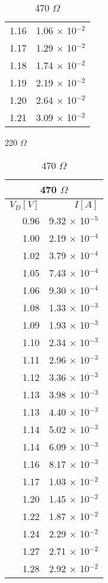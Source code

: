 \documentclass{ltjsarticle}
\begin{document}
\begin{table}[H]
\begin{minipage}[t]{0.24\hsize}
\begin{tabular}{|r|r|}
      1.16 & 1.06 ${\times}$ 10${^{-2}}$ \\
      1.17 & 1.29 ${\times}$ 10${^{-2}}$ \\
      1.18 & 1.74 ${\times}$ 10${^{-2}}$ \\
      1.19 & 2.19 ${\times}$ 10${^{-2}}$ \\
      1.20 & 2.64 ${\times}$ 10${^{-2}}$ \\
      1.21 & 3.09 ${\times}$ 10${^{-2}}$ \\ \hline
  \end{tabular}
  \caption{220 ${\Omega}$}
\end{minipage}
\begin{minipage}[t]{0.24\hsize}
  \vspace{0pt}
  \begin{tabular}{|r|r|}
    \hline
    \multicolumn{2}{|c|}{470 ${\Omega}$} \\ \hline
    ${V_D[V]}$ & ${I[A]}$ \\
    \hline
    0.96 & 9.32 ${\times}$ 10${^{-5}}$ \\
    1.00 & 2.19 ${\times}$ 10${^{-4}}$ \\
    1.02 & 3.79 ${\times}$ 10${^{-4}}$ \\
    1.05 & 7.43 ${\times}$ 10${^{-4}}$ \\
    1.06 & 9.30 ${\times}$ 10${^{-4}}$ \\
    1.08 & 1.33 ${\times}$ 10${^{-3}}$ \\
    1.09 & 1.93 ${\times}$ 10${^{-3}}$ \\
    1.10 & 2.34 ${\times}$ 10${^{-3}}$ \\
    1.11 & 2.96 ${\times}$ 10${^{-3}}$ \\
    1.12 & 3.36 ${\times}$ 10${^{-3}}$ \\
    1.13 & 3.98 ${\times}$ 10${^{-3}}$ \\
    1.13 & 4.40 ${\times}$ 10${^{-3}}$ \\
    1.14 & 5.02 ${\times}$ 10${^{-3}}$ \\
    1.14 & 6.09 ${\times}$ 10${^{-3}}$ \\
    1.16 & 8.17 ${\times}$ 10${^{-3}}$ \\
    1.17 & 1.03 ${\times}$ 10${^{-2}}$ \\
    1.20 & 1.45 ${\times}$ 10${^{-2}}$ \\
    1.22 & 1.87 ${\times}$ 10${^{-2}}$ \\
    1.24 & 2.29 ${\times}$ 10${^{-2}}$ \\
    1.27 & 2.71 ${\times}$ 10${^{-2}}$ \\
    1.28 & 2.92 ${\times}$ 10${^{-2}}$ \\ \hline
\end{tabular}
  \caption{470 ${\Omega}$}
\end{minipage}
\end{table}
\end{document}
